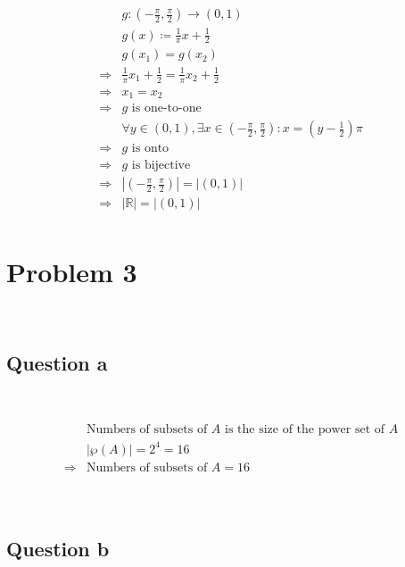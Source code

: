 \documentclass{article}
\begin{document}
\begin{equation*}
    \begin{split}
        &g :(-\frac{\pi}{2},\frac{\pi}{2}) \rightarrow (0,1)\\
        &g(x)\coloneqq \frac{1}{\pi}x+\frac{1}{2}\\
        &g(x_1)=g(x_2)\\
        \Rightarrow&\frac{1}{\pi}x_1+\frac{1}{2}=\frac{1}{\pi}x_2+\frac{1}{2}\\
        \Rightarrow&x_1=x_2\\
        \Rightarrow&g\text{ is one-to-one}\\
        &\forall y\in(0,1),\exists x\in(-\frac{\pi}{2},\frac{\pi}{2}) :x=(y-\frac{1}{2})\pi\\
        \Rightarrow& g\text{ is onto}\\
        \Rightarrow&g\text{ is bijective}\\
        \Rightarrow&|(-\frac{\pi}{2},\frac{\pi}{2})|=|(0,1)|\\
        \Rightarrow&|\mathbb{R} |=|(0,1)|\\
    \end{split}
\end{equation*}

\newpage

\section*{Problem 3}

~

\subsection*{Question a}

~

\begin{equation*}
    \begin{split}
        &\text{Numbers of subsets of }A\text{ is the size of the power set of }A\\
        &|\wp(A)|=2^4=16\\
        \Rightarrow& \text{Numbers of subsets of }A=16\\
    \end{split}
\end{equation*}

~

\subsection*{Question b}
\end{document}
